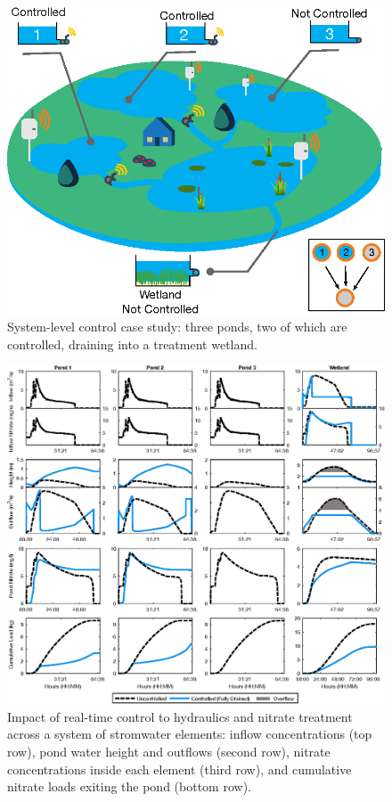\

\begin{figure}
\centering
 \includegraphics{gfx/Chapter-1/Glo_sys_rep.eps}
 \caption{System-level control case study: three ponds, two of which are controlled, draining into a treatment wetland.}\label{fig-ch1:sys_diagram}
\end{figure}

\begin{figure}
	\includegraphics[width=\linewidth]{gfx/Chapter-1/Global.eps}
  \caption{Impact of real-time control to hydraulics and nitrate treatment across a system of stromwater elements: inflow concentrations (top row), pond water height and outflows (second row), nitrate concentrations inside each element (third row), and cumulative nitrate loads exiting the pond (bottom row).}\label{fig-ch1:globalcase}
\end{figure}

